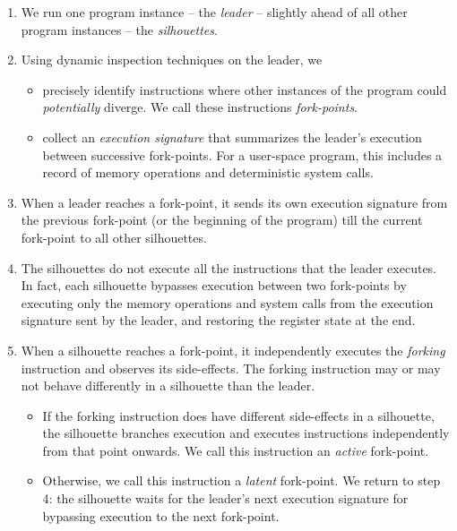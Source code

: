 \begin{enumerate}

\item We run one program instance -- the {\em leader} -- 
slightly ahead of all other program instances -- the {\em silhouettes}.

\item Using dynamic inspection techniques on the leader, we
\begin{itemize}
\item precisely identify instructions where other instances of the
program could {\em potentially} diverge. We call these instructions {\em fork-points}.
\item collect an {\em execution signature} that summarizes the 
leader's execution between successive fork-points. For a user-space program, 
this includes a record of memory operations and 
deterministic system calls.
\end{itemize}

\item When a leader reaches a fork-point, it sends its
own execution signature from the previous fork-point (or the
beginning of the program) till the current fork-point to all
other silhouettes. 

\item The silhouettes do not execute
all the instructions that the leader executes.
In fact, each silhouette bypasses execution between
two fork-points by executing only the memory
operations and system calls from the 
execution signature sent by the leader,
and restoring the register state at the end.

\item 
When a silhouette reaches a fork-point, it 
independently executes the {\em forking} instruction
and observes its side-effects.
The forking instruction may or 
may not behave differently
in a silhouette than the leader.

\begin{itemize}
\item If the forking instruction
does have different side-effects
in a silhouette, the silhouette branches execution and 
executes instructions independently
from that point onwards. 
We call this instruction an {\em active} fork-point.

\item Otherwise, we call this instruction a {\em latent} fork-point. 
We return to step 4: the silhouette waits for the leader's
next execution signature for bypassing
execution to the next fork-point.

\end{itemize}
\end{enumerate}

